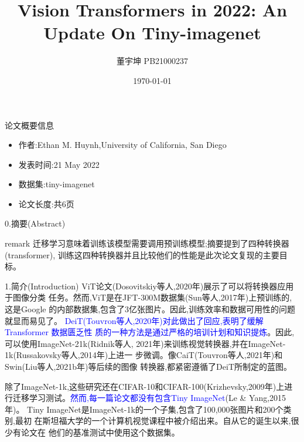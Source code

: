 \documentclass[UTF8]{ctexbeamer}
\title[论文复现报告]{Vision Transformers in 2022:
An Update On Tiny-imagenet}
\author[董宇坤]{董宇坤 PB21000237}
\institute[ustc]{dyk2021@mail.ustc.edu.cn}
\date[\today]{\today}
\begin{document}
\begin{frame}
    \titlepage
\end{frame}

\begin{frame}{论文概要信息}
  \begin{itemize}
    \item 作者:Ethan M. Huynh,University of California, San Diego
    \item 发表时间:21 May 2022
    \item 数据集:tiny-imagenet
    \item 论文长度:共6页
  \end{itemize}
\end{frame}

\begin{frame}{0.摘要(Abstract)}
  \begin{block}{remark}
    迁移学习意味着训练该模型需要调用预训练模型;摘要提到了四种转换器(transformer),
    训练这四种转换器并且比较他们的性能是此次论文复现的主要目标。
  \end{block}
\end{frame}

\begin{frame}{1.简介(Introduction)}
  \kaishu ViT论文(Dosovitskiy等人,2020年)展示了可以将转换器应用于图像分类
  任务。然而,ViT是在JFT-300M数据集(Sun等人,2017年)上预训练的,这是Google
  的内部数据集,包含了3亿张图片。因此,训练效率和数据可用性的问题就显而易见了。
  \textcolor{blue}{DeiT(Touvron等人,2020年)对此做出了回应,表明了缓解 Transformer 数据匮乏性
  质的一种方法是通过严格的培训计划和知识提炼}。因此,可以使用ImageNet-21k(Ridnik等人,
  2021年)来训练视觉转换器,并在ImageNet-1k(Russakovsky等人,2014年)上进一
  步微调。像CaiT(Touvron等人,2021年)和Swin(Liu等人,2021b年)等后续的图像
  转换器,都紧密遵循了DeiT所制定的蓝图。

  除了ImageNet-1k,这些研究还在CIFAR-10和CIFAR-100(Krizhevsky,2009年)上进
  行迁移学习测试。\textcolor{blue}{然而,每一篇论文都没有包含Tiny ImageNet}(Le \& Yang,2015年)。
  Tiny ImageNet是ImageNet-1k的一个子集,包含了100,000张图片和200个类别,最初
  在斯坦福大学的一个计算机视觉课程中被介绍出来。自从它的诞生以来,很少有论文在
  他们的基准测试中使用这个数据集。
\end{frame}
\end{document}
